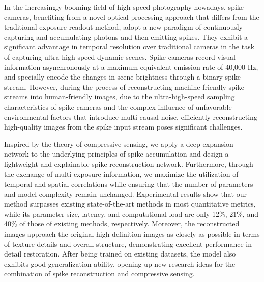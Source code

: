 \begin{abstract*}
  In the increasingly booming field of high-speed photography nowadays, spike cameras, benefiting from a novel optical processing approach that differs from the traditional exposure-readout method, adopt a new paradigm of continuously capturing and accumulating photons and then emitting spikes. They exhibit a significant advantage in temporal resolution over traditional cameras in the task of capturing ultra-high-speed dynamic scenes. Spike cameras record visual information asynchronously at a maximum equivalent emission rate of 40,000 Hz, and specially encode the changes in scene brightness through a binary spike stream. However, during the process of reconstructing machine-friendly spike streams into human-friendly images, due to the ultra-high-speed sampling characteristics of spike cameras and the complex influence of unfavorable environmental factors that introduce multi-causal noise, efficiently reconstructing high-quality images from the spike input stream poses significant challenges.
  
  Inspired by the theory of compressive sensing, we apply a deep expansion network to the underlying principles of spike accumulation and design a lightweight and explainable spike reconstruction network. Furthermore, through the exchange of multi-exposure information, we maximize the utilization of temporal and spatial correlations while ensuring that the number of parameters and model complexity remain unchanged. Experimental results show that our method surpasses existing state-of-the-art methods in most quantitative metrics, while its parameter size, latency, and computational load are only 12\%, 21\%, and 40\% of those of existing methods, respectively. Moreover, the reconstructed images approach the original high-definition images as closely as possible in terms of texture details and overall structure, demonstrating excellent performance in detail restoration. After being trained on existing datasets, the model also exhibits good generalization ability, opening up new research ideas for the combination of spike reconstruction and compressive sensing.  
\end{abstract*}
